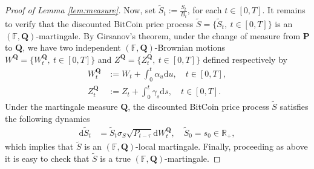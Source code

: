 \documentclass[12pt,centertags,reqno]{amsart}
\numberwithin{equation}{section} \makeatletter
\def \F {\mathcal F}
\def \P {\mathbf P}
\def \Q {\mathbf Q}
\def \R {\mathbb R}
\def \bF {\mathbb F}
\newcommand{\ud}{\mathrm d}
\newcommand{\ds}{\displaystyle}
\newcommand{\esp}[2][\mathbb E] {#1\left[#2\right]}
\begin{document}
\begin{proof}[Proof of Lemma \ref{lem:measure}]
Now, set $\widetilde S_t:= \ds \frac{S_t}{B_t}$, for each $t \in [0,T]$.
It remains to verify that the discounted BitCoin price process $\widetilde S=\{\widetilde S_t,\ t \in [0,T]\}$ is an $(\bF,\Q)$-martingale.
By Girsanov's theorem, under the change of measure from $\P$ to $\Q$, we have two independent $(\bF,\Q)$-Brownian motions $W^\Q=\{W_t^\Q,\ t \in [0,T]\}$ and $Z^\Q=\{Z_t^\Q,\ t \in [0,T]\}$ defined respectively by
\begin{align*}
W_t^\Q & := W_t + \int_0^t\alpha_u \ud u,\quad t \in [0,T],\\
Z_t^\Q & := Z_t + \int_0^t\gamma_s \ud s,
\quad t \in [0,T].
\end{align*}
Under the martingale measure $\Q$, the discounted BitCoin price process $\widetilde S$ satisfies the following dynamics
\begin{align*}
\ud \widetilde S_t & =  \widetilde S_t\sigma_S\sqrt{P_{t-\tau}}\ud W_t^\Q, \quad \widetilde S_0=s_0 \in \R_+,
\end{align*}
which implies that $\widetilde S$ is an $(\bF,\Q)$-local martingale. Finally, proceeding as above it is easy to check that $\widetilde S$ is a true $(\bF,\Q)$-martingale.

\end{proof}
\end{document}
